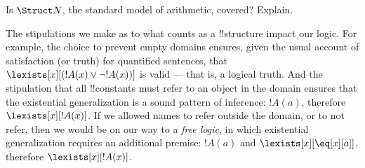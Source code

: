 \documentclass[../../include/open-logic-section]{subfiles}
\begin{document}
\begin{prob}
Is $\Struct N$, the standard model of arithmetic, covered? Explain.
\end{prob}

\begin{digress}
The stipulations we make as to what counts as a !!{structure} impact
our logic. For example, the choice to prevent empty domains ensures,
given the usual account of satisfaction (or truth) for quantified
sentences, that $\lexists[x][(!A(x) \lor \lnot !A(x))]$ is valid ---
that is, a logical truth. And the stipulation that all !!{constant}s
must refer to an object in the domain ensures that the existential
generalization is a sound pattern of inference: $!A(a)$, therefore
$\lexists[x][!A(x)]$. If we allowed names to refer outside the domain,
or to not refer, then we would be on our way to a \emph{free logic},
in which existential generalization requires an additional premise:
$!A(a)$ and $\lexists[x][\eq[x][a]]$, therefore $\lexists[x][!A(x)]$.
\end{digress}
\end{document}
